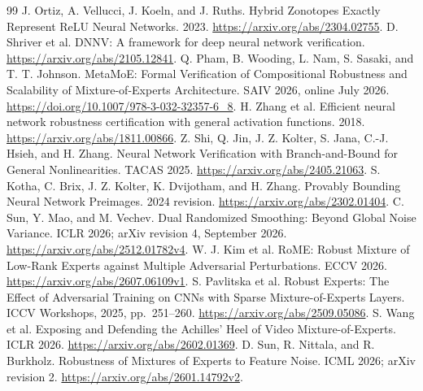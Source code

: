 \documentclass[11pt]{article}
\begin{document}
\begin{thebibliography}{99}
 J. Ortiz, A. Vellucci, J. Koeln, and J. Ruths.
Hybrid Zonotopes Exactly Represent ReLU Neural Networks. 2023.
\url{https://arxiv.org/abs/2304.02755}.
 D. Shriver et al. DNNV: A framework for deep neural network verification.
\url{https://arxiv.org/abs/2105.12841}.
 Q. Pham, B. Wooding, L. Nam, S. Sasaki, and T. T. Johnson.
MetaMoE: Formal Verification of Compositional Robustness and Scalability of
Mixture-of-Experts Architecture. SAIV 2026, online July 2026.
\url{https://doi.org/10.1007/978-3-032-32357-6_8}.
 H. Zhang et al. Efficient neural network robustness certification
with general activation functions. 2018. \url{https://arxiv.org/abs/1811.00866}.
 Z. Shi, Q. Jin, J. Z. Kolter, S. Jana, C.-J. Hsieh, and H. Zhang.
Neural Network Verification with Branch-and-Bound for General Nonlinearities.
TACAS 2025. \url{https://arxiv.org/abs/2405.21063}.
 S. Kotha, C. Brix, J. Z. Kolter, K. Dvijotham, and H. Zhang.
Provably Bounding Neural Network Preimages. 2024 revision.
\url{https://arxiv.org/abs/2302.01404}.
 C. Sun, Y. Mao, and M. Vechev.
Dual Randomized Smoothing: Beyond Global Noise Variance.
ICLR 2026; arXiv revision 4, September 2026.
\url{https://arxiv.org/abs/2512.01782v4}.
 W. J. Kim et al.
RoME: Robust Mixture of Low-Rank Experts against Multiple Adversarial Perturbations.
ECCV 2026. \url{https://arxiv.org/abs/2607.06109v1}.
 S. Pavlitska et al.
Robust Experts: The Effect of Adversarial Training on CNNs with Sparse Mixture-of-Experts Layers.
ICCV Workshops, 2025, pp.\ 251--260. \url{https://arxiv.org/abs/2509.05086}.
 S. Wang et al.
Exposing and Defending the Achilles' Heel of Video Mixture-of-Experts.
ICLR 2026. \url{https://arxiv.org/abs/2602.01369}.
 D. Sun, R. Nittala, and R. Burkholz.
Robustness of Mixtures of Experts to Feature Noise.
ICML 2026; arXiv revision 2. \url{https://arxiv.org/abs/2601.14792v2}.
\end{thebibliography}
\end{document}
